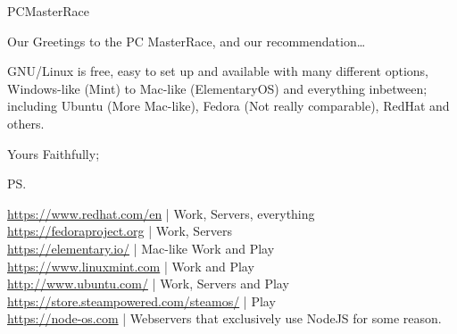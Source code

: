 \documentclass[a5paper, 12pt]{letter} %
\begin{document}
\begin{letter}{PCMasterRace}
\opening{Our Greetings to the PC MasterRace, and our recommendation\ldots}

GNU/Linux is free, easy to set up and available with many different options, Windows-like (Mint) to Mac-like (ElementaryOS) and everything inbetween; including Ubuntu (More Mac-like), Fedora (Not really comparable), RedHat and others.

\closing{Yours Faithfully;}

\ps %

\url{https://www.redhat.com/en} | Work, Servers, everything \\
\url{https://fedoraproject.org} | Work, Servers \\
\url{https://elementary.io/} | Mac-like Work and Play \\
\url{https://www.linuxmint.com} | Work and Play \\
\url{http://www.ubuntu.com/} | Work, Servers and Play \\
\url{https://store.steampowered.com/steamos/} | Play \\
\url{https://node-os.com} | Webservers that exclusively use NodeJS for some reason.

\end{letter}
\end{document}
